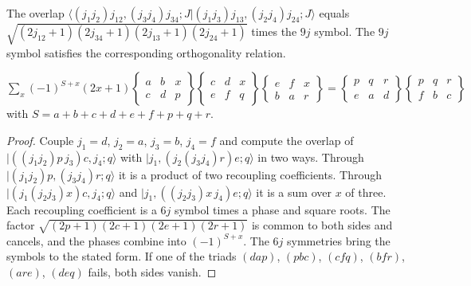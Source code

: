\begin{theorem}\label{thm:9j}
  The overlap $\langle(j_1j_2)j_{12},(j_3j_4)j_{34};J|(j_1j_3)j_{13},(j_2j_4)j_{24};J\rangle$ equals
  $\sqrt{(2j_{12}+1)(2j_{34}+1)(2j_{13}+1)(2j_{24}+1)}$ times the $9j$ symbol. The $9j$ symbol satisfies the corresponding
  orthogonality relation.
\end{theorem}

\begin{theorem}\label{thm:biedenharn-elliott}
  \leanok
  $\sum_x(-1)^{S+x}(2x+1)\begin{Bmatrix}a&b&x\\c&d&p\end{Bmatrix}\begin{Bmatrix}c&d&x\\e&f&q\end{Bmatrix}
  \begin{Bmatrix}e&f&x\\b&a&r\end{Bmatrix}=\begin{Bmatrix}p&q&r\\e&a&d\end{Bmatrix}\begin{Bmatrix}p&q&r\\f&b&c\end{Bmatrix}$
  with $S=a+b+c+d+e+f+p+q+r$.
\end{theorem}

\begin{proof}\leanok
  Couple $j_1=d$, $j_2=a$, $j_3=b$, $j_4=f$ and compute the overlap of $|((j_1j_2)p\,j_3)c,j_4;q\rangle$ with
  $|j_1,(j_2(j_3j_4)r)e;q\rangle$ in two ways. Through $|(j_1j_2)p,(j_3j_4)r;q\rangle$ it is a product of two recoupling
  coefficients. Through $|(j_1(j_2j_3)x)c,j_4;q\rangle$ and $|j_1,((j_2j_3)x\,j_4)e;q\rangle$ it is a sum over $x$ of three. Each
  recoupling coefficient is a $6j$ symbol times a phase and square roots. The factor
  $\sqrt{(2p+1)(2c+1)(2e+1)(2r+1)}$ is common to both sides and cancels, and the phases combine into $(-1)^{S+x}$. The $6j$ symmetries
  bring the symbols to the stated form. If one of the triads $(dap)$, $(pbc)$, $(cfq)$, $(bfr)$, $(are)$, $(deq)$ fails, both
  sides vanish.
\end{proof}

